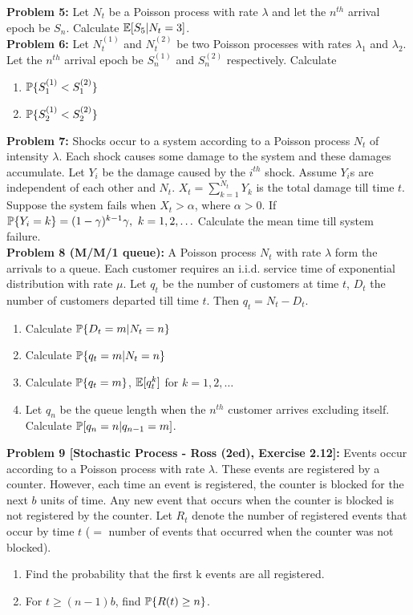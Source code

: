 \documentclass[a4paper,10pt,english]{article}
\begin{document}
\indent \textbf{Problem 5:} Let $N_t$ be a Poisson process with rate $\lambda$ and let the $n^{th}$ arrival epoch be $S_n$. Calculate $\E[S_5|N_t = 3]$. \\
\indent \textbf{Problem 6:} Let $N^{(1)}_t$ and $N^{(2)}_t$ be two  Poisson processes with rates $\lambda_1$ and $\lambda_2$. Let the $n^{th}$ arrival epoch be $S^{(1)}_n$ and $S^{(2)}_n$ respectively. Calculate
\begin{enumerate}
\item $\P\{ S^{(1)}_1 < S^{(2)}_1\}$
\item $\P\{ S^{(1)}_2 < S^{(2)}_2\}$
\end{enumerate} 

\indent \textbf{Problem 7:} Shocks occur to a system according to a Poisson process $N_t$ of intensity $\lambda$. Each shock causes some damage to the system and these damages accumulate. Let $Y_i$ be the damage caused by the $i^{th}$ shock. Assume $Y_i$s are independent of each other and $N_t$. $X_t = \sum_{k=1}^{N_t} Y_k$ is the total damage till time $t$. Suppose the system fails when $X_t > \alpha$, where $\alpha > 0$. If $\P\{Y_i = k\} = (1-\gamma)^{k-1}\gamma, \ k = 1,2,\ldots$ Calculate the mean time till system failure.  \\
\indent \textbf{Problem 8 (M/M/1 queue):} A Poisson process $N_t$ with rate $\lambda$ form the arrivals to a queue. Each customer requires an i.i.d. service time of exponential distribution with rate $\mu$. Let $q_t$ be the number of customers at time $t$, $D_t$ the number of customers departed till time $t$. Then $q_t = N_t - D_t$. 
\begin{enumerate}
\item Calculate $\P\{D_t=m|N_t=n\}$
\item Calculate $\P\{q_t=m|N_t=n\}$
\item Calculate $\P\{q_t=m\}$, $\E[q_t^k]$ for $k=1,2,\ldots$
\item Let $q_n$ be the queue length when the $n^{th}$ customer arrives excluding itself. Calculate $\P[q_n = n|q_{n-1} = m]$.
\end{enumerate}

\indent \textbf{Problem 9 [Stochastic Process - Ross (2ed), Exercise 2.12]:} Events occur according to a Poisson process with rate $\lambda$. These events are registered by a counter. However, each time an event is registered, the counter is blocked for the next $b$ units of time. Any new event that occurs when the counter is blocked is not registered by the counter. Let $R_t$ denote the number of registered events that occur by time $t$ ($=$ number of events that occurred when the counter was not blocked). 
\begin{enumerate}
\item Find the probability that the first k events are all registered.
\item For $t \geq (n-1)b$, find $\P\{R(t) \geq n\}$.
\end{enumerate}
\end{document}
